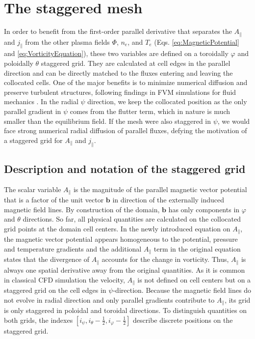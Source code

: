 \section{The staggered mesh}

In order to benefit from the first-order parallel derivative that separates the $A_\parallel$ and $j_\parallel$ from the other plasma fields $\Phi$, $n_e$, and $T_e$ (Eqs. \ref{eq:MagneticPotential} and \ref{eq:VorticityEquation}), these two variables are defined on a toroidally $\varphi$ and poloidally $\theta$ staggered grid. They are calculated at cell edges in the parallel direction and can be directly matched to the fluxes entering and leaving the collocated cells. One of the major benefits is to minimize numerical diffusion and preserve turbulent structures, following findings in FVM simulations for fluid mechanics \cite{meier1999comparison}. In the radial $\psi$ direction, we keep the collocated position as the only parallel gradient in $\psi$ comes from the flutter term, which in nature is much smaller than the equilibrium field. If the mesh were also staggered in $\psi$, we would face strong numerical radial diffusion of parallel fluxes, defying the motivation of a staggered grid for $A_\parallel$ and $j_\parallel$. \newline



\subsection{Description and notation of the staggered grid}
The scalar variable $A_\parallel$ is the magnitude of the parallel magnetic vector potential that is a factor of the unit vector $\mathbf{b}$ in direction of the externally induced magnetic field lines. By construction of the domain, $\mathbf{b}$ has only components in $\varphi$ and $\theta$ directions. So far, all physical quantities are calculated on the collocated grid points at the domain cell centers. In the newly introduced equation on $A_\parallel$, the magnetic vector potential appears homogeneous to the potential, pressure and temperature gradients and the additional $A_\parallel$ term in the original equation states that the divergence of $A_\parallel$ accounts for the change in vorticity. Thus, $A_\parallel$ is always one spatial derivative away from the original quantities. As it is common in classical CFD simulation the velocity, $A_\parallel$ is not defined on cell centers but on a staggered grid on the cell edges in $\psi$-direction. Because the magnetic field lines do not evolve in radial direction and only parallel gradients contribute to $A_\parallel$, its grid is only staggered in  poloidal and toroidal directions. To distinguish quantities on both grids, the indexes $[i_\psi, i_\theta - \frac{1}{2},i_\varphi-\frac{1}{2}]$ describe discrete positions on the staggered grid. \\

